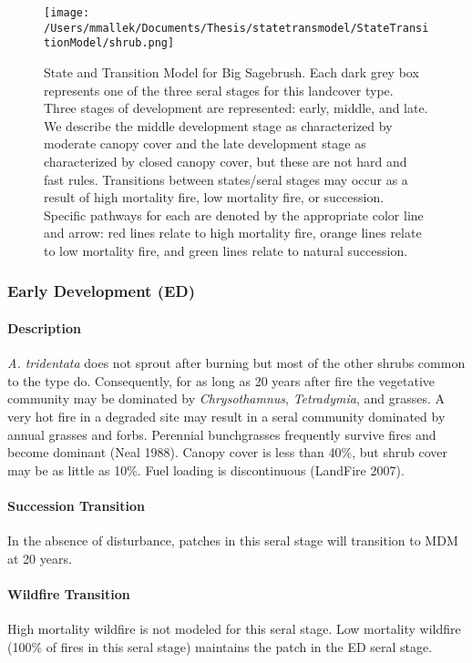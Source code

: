 \begin{figure}[htbp]
\centering
\texttt{[image: /Users/mmallek/Documents/Thesis/statetransmodel/StateTransitionModel/shrub.png]}
\caption{State and Transition Model for Big Sagebrush. Each dark grey box represents one of the three seral stages for this landcover type. Three stages of development are represented: early, middle, and late. We describe the middle development stage as characterized by moderate canopy cover and the late development stage as characterized by closed canopy cover, but these are not hard and fast rules. Transitions between states/seral stages may occur as a result of high mortality fire, low mortality fire, or succession. Specific pathways for each are denoted by the appropriate color line and arrow: red lines relate to high mortality fire, orange lines relate to low mortality fire, and green lines relate to natural succession.} 
\label{sage_transmodel}
\end{figure}

\subsubsection*{Early Development (ED)}

\paragraph*{Description} \emph{A. tridentata} does not sprout after burning but most of the other shrubs common to the type do. Consequently, for as long as 20 years after fire the vegetative community may be dominated by \emph{Chrysothamnus}, \emph{Tetradymia}, and grasses. A very hot fire in a degraded site may result in a seral community dominated by annual grasses and forbs. Perennial bunchgrasses frequently survive fires and become dominant (Neal 1988). Canopy cover is less than 40\%, but shrub cover may be as little as 10\%. Fuel loading is discontinuous (LandFire 2007).

\paragraph*{Succession Transition} In the absence of disturbance, patches in this seral stage will transition to MDM at 20 years. 

\paragraph*{Wildfire Transition} High mortality wildfire is not modeled for this seral stage. Low mortality wildfire (100\% of fires in this seral stage) maintains the patch in the ED seral stage. 

